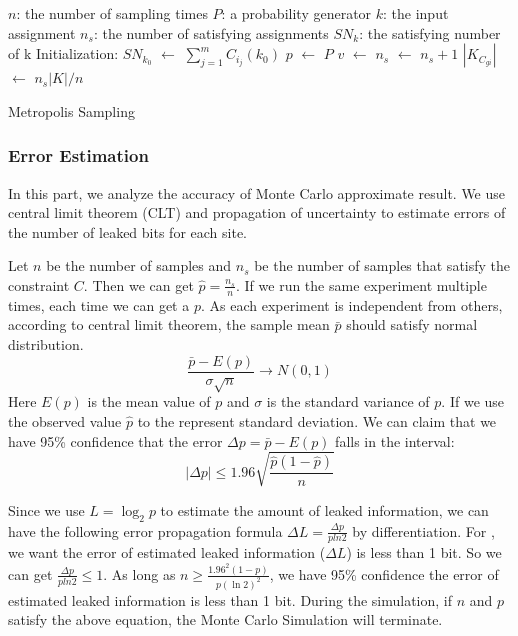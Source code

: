 \IncMargin{1em}
\begin{algorithm}
\SetAlgoLined
\DontPrintSemicolon


$n$: the number of sampling times \;
$P$: a probability generator \;
$k$: the input assignment \;
$n_{s}$: the number of satisfying assignments \;
$SN_k$: the satisfying number of k \; 
Initialization: \;
$SN_{k_0}$ $\leftarrow$ $\sum_{j=1}^{m}C_{i_j}(k_0)$ \;
 {
      $p$ $\leftarrow$ $P$ \;
      {
        $v$ $\leftarrow$  {}
      }
      {$n_{s}$ $\leftarrow$ $n_{s} + 1$}
}
$|K_{C_{gi}}|$ $\leftarrow$ $n_s|K| / n$
\caption{Metropolis Sampling}
\end{algorithm}
\DecMargin{1em}

\subsubsection{Error Estimation}
In this part, we analyze the accuracy of Monte Carlo approximate
result. We use central limit theorem (CLT) and propagation of uncertainty 
to estimate errors of the number of leaked bits for each site.

Let $n$ be the number of samples and $n_s$ be the number of samples
that satisfy the constraint $C$. Then we can get $\hat{p} = \frac{n_s}{n}$.
If we run the same experiment multiple times, each time we can
get a $p$. 
As each experiment is independent from others, according to 
central limit theorem, the sample mean $\bar{p}$ should 
satisfy normal distribution.
$$ \frac{\bar{p}-E(p)}{\sigma\sqrt{n}} \rightarrow N(0,1) $$
Here $E(p)$ is the mean value of $p$ and $\sigma$ is the standard 
variance of $p$. If we use the observed value $\hat{p}$ 
to the represent standard deviation.
We can claim that we have 95\% confidence that the error 
$\Delta p= \bar{p} - E(p)$ falls in the interval:
$$ |\Delta p| \leq 1.96\sqrt{\frac{ \hat{p} (1- \hat{p} )}{n}}$$

Since we use $L = \log_{2}p$ to estimate the amount of leaked information,
we can have the following error propagation formula $\Delta L = \frac{\Delta p}{pln2}$
by differentiation. For \tool, we want the error of estimated leaked information ($\Delta L$) is 
less than 1 bit. So we can get $\frac{\Delta p}{pln2} \leq 1$. As long as
$ n \geq \frac{1.96^2(1-p)}{p(\ln2)^2}$, we have 95\% confidence the error of estimated 
leaked information is less than 1 bit. During the simulation, if $n$ and $p$ satisfy
the above equation, the Monte Carlo Simulation will terminate.



